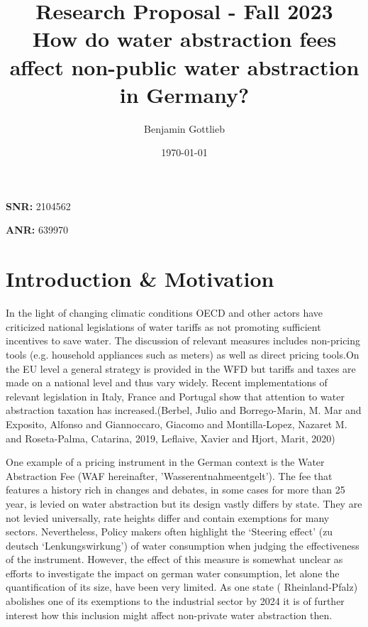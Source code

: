 \documentclass[11pt]{article}
\author{Benjamin Gottlieb}
\date{\today}
\title{Research Proposal - Fall 2023\\\medskip
\large How do water abstraction fees affect non-public water abstraction in Germany?}
\begin{document}
\maketitle
\vspace{10mm}

\textbf{SNR:} 2104562

\textbf{ANR:} 639970

\vspace{10mm}

\newpage

\setcounter{tocdepth}{2}
\tableofcontents

\newpage

\section{Introduction \&  Motivation}
\label{sec:orgdad9396}
\label{sec:intro & motivation}

In the light of changing climatic conditions OECD and other actors have criticized national legislations of water tariffs as not promoting sufficient incentives to save water. The discussion of relevant measures includes non-pricing tools (e.g. household appliances such as meters) as well as direct pricing tools.On the EU level a general strategy is provided in the WFD but tariffs and taxes are made on a national level and thus vary widely. Recent implementations of relevant legislation in Italy, France and Portugal show that attention to water abstraction taxation has increased.(Berbel, Julio and Borrego-Marin, M. Mar and Exposito, Alfonso and Giannoccaro, Giacomo and Montilla-Lopez, Nazaret M. and Roseta-Palma, Catarina, 2019,  Leflaive, Xavier and Hjort, Marit, 2020)

One example of a pricing instrument in the German context is the Water Abstraction Fee (WAF hereinafter, 'Wasserentnahmeentgelt'). The fee that features a history rich in changes and debates, in some cases for more than 25 year, is levied on water abstraction but its design vastly differs by state. They are not levied universally, rate heights differ and contain exemptions for many sectors. Nevertheless, Policy makers often highlight the ‘Steering effect’ 
(zu deutsch ‘Lenkungswirkung’) of water consumption when judging the effectiveness of the instrument. However, the effect of this measure is somewhat unclear as efforts to investigate the impact on german water consumption, let alone the quantification of its size, have been very limited. As one state ( Rheinland-Pfalz) abolishes one of its exemptions to the industrial sector by 2024 it is of further interest how this inclusion might affect non-private water abstraction then.
\end{document}
